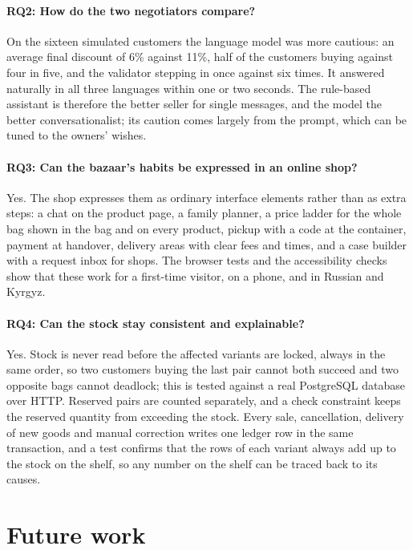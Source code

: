 \paragraph{RQ2: How do the two negotiators compare?} On the sixteen simulated customers the language model was more
cautious: an average final discount of 6\% against 11\%, half of the customers buying against four in five, and the
validator stepping in once against six times. It answered naturally in all three languages within one or two seconds.
The rule-based assistant is therefore the better seller for single messages, and the model the better
conversationalist; its caution comes largely from the prompt, which can be tuned to the owners' wishes.

\paragraph{RQ3: Can the bazaar's habits be expressed in an online shop?} Yes. The shop expresses them as ordinary
interface elements rather than as extra steps: a chat on the product page, a family planner, a price ladder for the
whole bag shown in the bag and on every product, pickup with a code at the container, payment at handover, delivery
areas with clear fees and times, and a case builder with a request inbox for shops. The browser tests and the
accessibility checks show that these work for a first-time visitor, on a phone, and in Russian and Kyrgyz.

\paragraph{RQ4: Can the stock stay consistent and explainable?} Yes. Stock is never read before the affected variants
are locked, always in the same order, so two customers buying the last pair cannot both succeed and two opposite bags
cannot deadlock; this is tested against a real PostgreSQL database over HTTP. Reserved pairs are counted separately,
and a check constraint keeps the reserved quantity from exceeding the stock. Every sale, cancellation, delivery of new
goods and manual correction writes one ledger row in the same transaction, and a test confirms that the rows of each
variant always add up to the stock on the shelf, so any number on the shelf can be traced back to its causes.

\section{Future work}

